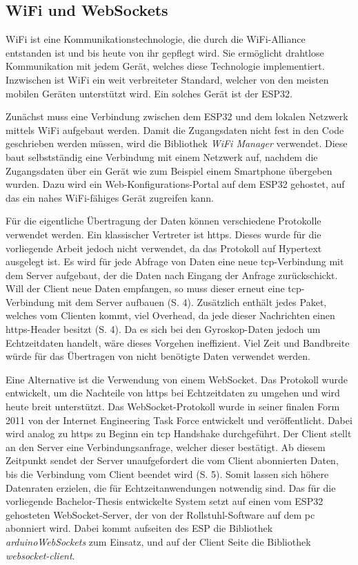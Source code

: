 \subsection{WiFi und WebSockets}
WiFi ist eine Kommunikationstechnologie, die durch die WiFi-Alliance entstanden ist und bis heute von ihr gepflegt wird\cite{WhoWeAre}.
Sie ermöglicht drahtlose Kommunikation mit jedem Gerät, welches diese Technologie implementiert.
Inzwischen ist WiFi ein weit verbreiteter Standard, welcher von den meisten mobilen Geräten unterstützt wird\cite{DiscoverWiFiWiFi}.
Ein solches Gerät ist der ESP32.

Zunächst muss eine Verbindung zwischen dem ESP32 und dem lokalen Netzwerk mittels WiFi aufgebaut werden.
Damit die Zugangsdaten nicht fest in den Code geschrieben werden müssen, wird die Bibliothek \textit{WiFi Manager}\cite{tzapuWiFiManager2022} verwendet.
Diese baut selbstständig eine Verbindung mit einem Netzwerk auf, nachdem die Zugangsdaten über ein Gerät wie zum Beispiel einem Smartphone übergeben wurden.
Dazu wird ein Web-Konfigurations-Portal auf dem ESP32 gehostet, auf das ein nahes WiFi-fähiges Gerät zugreifen kann.

Für die eigentliche Übertragung der Daten können verschiedene Protokolle verwendet werden.
Ein klassischer Vertreter ist \ac{https}.
Dieses wurde für die vorliegende Arbeit jedoch nicht verwendet, da das Protokoll auf Hypertext ausgelegt ist.
Es wird für jede Abfrage von Daten eine neue \ac{tcp}-Verbindung mit dem Server aufgebaut, der die Daten nach Eingang der Anfrage zurückschickt.
Will der Client neue Daten empfangen, so muss dieser erneut eine \ac{tcp}-Verbindung mit dem Server aufbauen (S. 4)\cite{ietfRFC6455WebSocket}.
Zusätzlich enthält jedes Paket, welches vom Clienten kommt, viel Overhead, da jede dieser Nachrichten einen \ac{https}-Header besitzt (S. 4)\cite{ietfRFC6455WebSocket}.
Da es sich bei den Gyroskop-Daten jedoch um Echtzeitdaten handelt, wäre dieses Vorgehen ineffizient.
Viel Zeit und Bandbreite würde für das Übertragen von nicht benötigte Daten verwendet werden.

Eine Alternative ist die Verwendung von einem WebSocket.
Das Protokoll wurde entwickelt, um die Nachteile von \ac{https} bei Echtzeitdaten zu umgehen und wird heute breit unterstützt.
Das WebSocket-Protokoll wurde in seiner finalen Form 2011 von der Internet Engineering Task Force entwickelt und veröffentlicht\cite{ietfRFC6455WebSocket}.
Dabei wird analog zu \ac{https} zu Beginn ein \ac{tcp} Handshake durchgeführt. Der Client stellt an den Server eine Verbindungsanfrage, welcher dieser bestätigt.
Ab diesem Zeitpunkt sendet der Server unaufgefordert die vom Client abonnierten Daten, bis die Verbindung vom Client beendet wird (S. 5)\cite{ietfRFC6455WebSocket}.
Somit lassen sich höhere Datenraten erzielen, die für Echtzeitanwendungen notwendig sind.
Das für die vorliegende Bachelor-Thesis entwickelte System setzt auf einen vom ESP32 gehosteten WebSocket-Server, der von der Rollstuhl-Software auf dem \ac{pc} abonniert wird.
Dabei kommt aufseiten des ESP die Bibliothek \textit{arduinoWebSockets}\cite{markusWebSocketServerClient2022} zum Einsatz, und auf der Client Seite die Bibliothek \textit{websocket-client}\cite{kotasWebsocketclient2022}.

